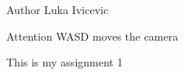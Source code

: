 \begin{DoxyAuthor}{Author}
Luka Ivicevic
\end{DoxyAuthor}
\begin{DoxyAttention}{Attention}
WASD moves the camera
\end{DoxyAttention}
This is my assignment 1 